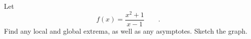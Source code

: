Let
\begin{equation*}
  f(x) = \frac{x^2+1}{x-1} \qquad .
\end{equation*}
Find any local and global
extrema, as well as any asymptotes. Sketch the graph.
